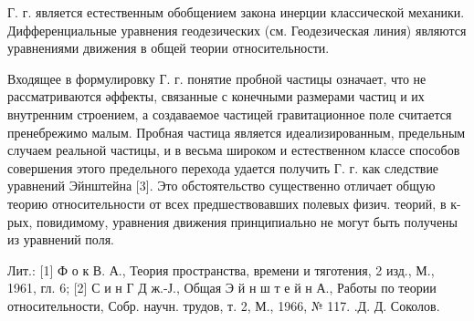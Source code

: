 \documentclass[10pt]{article}
\begin{document}
Г. г. является естественным обобщением закона инерции классической механики. Дифференциальные уравнения геодезических (см. Геодезическая линия) являются уравнениями движения в общей теории относительности.



Входящее в формулировку Г. г. понятие пробной частицы означает, что не рассматриваются әффекты, связанные с конечными размерами частиц и их внутренним строением, а создаваемое частицей гравитационное поле считается пренебрежимо малым. Пробная частица является идеализированным, предельным случаем реальной частицы, и в весьма широком и естественном классе способов совершения этого предельного перехода удается получить Г. г. как следствие уравнений Эйнштейна [3]. Это обстоятельство существенно отличает общую теорию относительности от всех предшествовавших полевых физич. теорий, в к-рых, повидимому, уравнения движения принципиально не могут быть получены из уравнений поля.



Лит.: [1] Ф о к В. А., Теория пространства, времени и тяготения, 2 изд., М., 1961, гл. 6; [2] С и н Г Д ж.-Ј., Общая Э й н ш т е й н А., Работы по теории относительности, Собр. научн. трудов, т. 2, М., 1966, № 117. .Д. Д. Соколов.
\end{document}
